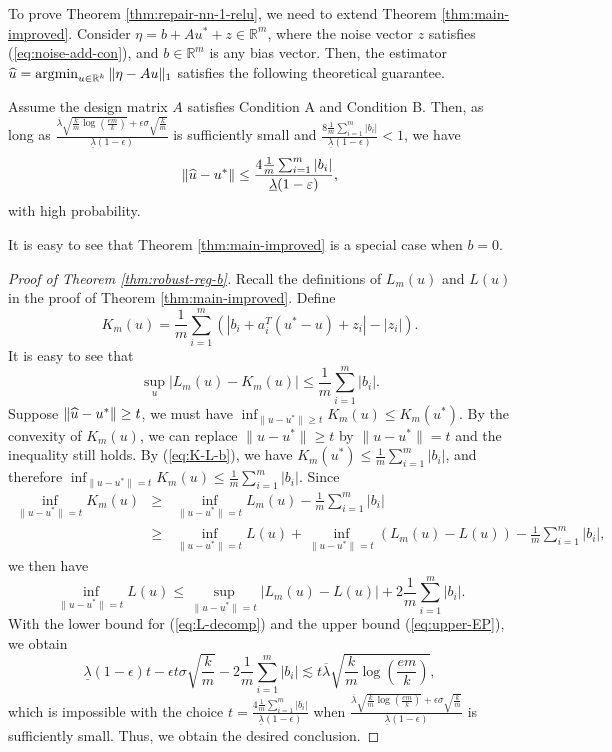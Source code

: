 To prove Theorem \ref{thm:repair-nn-1-relu}, we need to extend Theorem \ref{thm:main-improved}. Consider $\eta=b+Au^*+z\in\mathbb{R}^m$, where the noise vector $z$ satisfies (\ref{eq:noise-add-con}), and $b\in\mathbb{R}^m$ is any bias vector. Then, the estimator $\widehat{u}=\mathop{\rm argmin}_{u\in\mathbb{R}^k}\|\eta-Au\|_1$ satisfies the following theoretical guarantee.
\begin{thm}\label{thm:robust-reg-b}
Assume the design matrix $A$ satisfies Condition A and Condition B. Then, as long as $\frac{\overline{\lambda}\sqrt{\frac{k}{m}\log\left(\frac{em}{k}\right)}+\epsilon\sigma\sqrt{\frac{k}{m}}}{\underline{\lambda}(1-\epsilon)}$ is sufficiently small and $\frac{8\frac{1}{m}\sum_{i=1}^m|b_i|}{\underline{\lambda}(1-\epsilon)}<1$, we have
$$\|\widehat{u}-u^*\|\leq \frac{4\frac{1}{m}\sum_{i=1}^m|b_i|}{\underline{\lambda}(1-\varepsilon)},$$
with high probability.
\end{thm}
It is easy to see that Theorem \ref{thm:main-improved} is a special case when $b=0$.
\begin{proof}[Proof of Theorem \ref{thm:robust-reg-b}]
Recall the definitions of $L_m(u)$ and $L(u)$ in the proof of Theorem \ref{thm:main-improved}. Define
$$K_m(u)=\frac{1}{m}\sum_{i=1}^m\left(|b_i+a_i^T(u^*-u)+z_i|-|z_i|\right).$$
It is easy to see that
\begin{equation}
\sup_u|L_m(u)-K_m(u)|\leq \frac{1}{m}\sum_{i=1}^m|b_i|.\label{eq:K-L-b}
\end{equation}
Suppose $\|\widehat{u}-u^*\|\geq t$, we must have $\inf_{\|u-u^*\|\geq t}K_m(u) \leq K_m(u^*)$.
By the convexity of $K_m(u)$, we can replace $\|u-u^*\|\geq t$ by $\|u-u^*\| = t$ and the inequality still holds. By (\ref{eq:K-L-b}), we have $K_m(u^*)\leq \frac{1}{m}\sum_{i=1}^m|b_i|$, and therefore $\inf_{\|u-u^*\|= t}K_m(u)\leq \frac{1}{m}\sum_{i=1}^m|b_i|$. Since
\begin{eqnarray*}
\inf_{\|u-u^*\|= t}K_m(u) &\geq& \inf_{\|u-u^*\|= t}L_m(u) - \frac{1}{m}\sum_{i=1}^m|b_i| \\
&\geq& \inf_{\|u-u^*\|=t}L(u) + \inf_{\|u-u^*\|= t}(L_m(u)-L(u)) - \frac{1}{m}\sum_{i=1}^m|b_i|,
\end{eqnarray*}
we then have
\begin{equation}
\inf_{\|u-u^*\|=t}L(u) \leq \sup_{\|u-u^*\|= t}|L_m(u)-L(u)| + 2\frac{1}{m}\sum_{i=1}^m|b_i|. %
\end{equation}
With the lower bound for (\ref{eq:L-decomp}) and the upper bound (\ref{eq:upper-EP}), we obtain
$$\underline{\lambda}(1-\epsilon)t - \epsilon t\sigma\sqrt{\frac{k}{m}} - 2\frac{1}{m}\sum_{i=1}^m|b_i|\lesssim t\overline{\lambda}\sqrt{\frac{k}{m}\log\left(\frac{em}{k}\right)},$$
which is impossible with the choice $t=\frac{4\frac{1}{m}\sum_{i=1}^m|b_i|}{\underline{\lambda}(1-\epsilon)}$ when $\frac{\overline{\lambda}\sqrt{\frac{k}{m}\log\left(\frac{em}{k}\right)}+\epsilon\sigma\sqrt{\frac{k}{m}}}{\underline{\lambda}(1-\epsilon)}$ is sufficiently small. Thus, we obtain the desired conclusion.
\end{proof}

